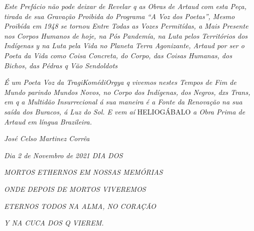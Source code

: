 \emph{Este Prefácio não pode deixar de Revelar q as Obras de Artaud com
esta Peça, tirada de sua Gravação Proibida do Programa ``A Voz dos
Poetas'', Mesmo Proibída em 1948 se tornou Entre Todas as Vozes Permitídas,
a Mais Presente nos Corpos Humanos de hoje, na Pós Pandemía, na Luta
pelos Territórios dos Indígenas y na Luta pela Vida no Planeta Terra
Agonizante, Artaud por ser o Poeta da Vida como Coisa Concreta, do
Corpo, das Coisas Humanas, dos Bichos, das Pédras q Vão Sendoldots{}}

\emph{É um Poeta Voz da TragiKomédiOrgya q vivemos nestes Tempos de Fim
de Mundo parindo Mundos Novos, no Corpo dos Indígenas, dos Negros, dxs
Trans, em q a Multidão Insurrecional á sua maneira é a Fonte da
Renovação na sua saída dos Buracos, á Luz do Sol. E vem aí}
HELIOGÁBALO \emph{a Obra Prima de Artaud em língua Brazileira.}

\bigskip

\hfill\emph{José Celso Martinez Corrêa}


\hfill\emph{Dia 2 de Novembro de 2021 DIA DOS}

\hfill\emph{MORTOS ETHERNOS EM NOSSAS MEMÓRIAS}

\hfill\emph{ONDE DEPOIS DE MORTOS VIVEREMOS}

\hfill\emph{ETERNOS TODOS NA ALMA, NO CORAÇÃO}

\hfill\emph{Y NA CUCA DOS Q VIEREM.}
